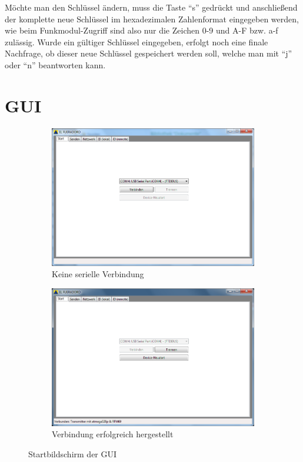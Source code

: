 \documentclass[paper=a4, parskip, numbers=noenddot, toc=listof, headsepline]{scrbook}
\begin{document}
					Möchte man den Schlüssel ändern, muss die Taste \enquote{s} gedrückt und anschließend der komplette neue Schlüssel im hexadezimalen Zahlenformat eingegeben werden, wie beim Funkmodul-Zugriff sind also nur die Zeichen 0-9 und A-F bzw. a-f zulässig. Wurde ein gültiger Schlüssel eingegeben, erfolgt noch eine finale Nachfrage, ob dieser neue Schlüssel gespeichert werden soll, welche man mit \enquote{j} oder \enquote{n} beantworten kann.
					\clearpage

			\section{GUI}

				\begin{figure}[!h]%
					\centering
					\begin{subfigure}[t]{0.45\textwidth}
						\includegraphics[width=\textwidth]{bilder/gui-start}
						\caption{Keine serielle Verbindung}
						\label{fig:gui-unconnected}
					\end{subfigure}
					\begin{subfigure}[t]{0.45\textwidth}
						\includegraphics[width=\textwidth]{bilder/gui-connected}
						\caption{Verbindung erfolgreich hergestellt}
						\label{fig:gui-connected}
					\end{subfigure}
					\caption{Startbildschirm der GUI}
					\label{fig:gui-start}
				\end{figure}
\end{document}
